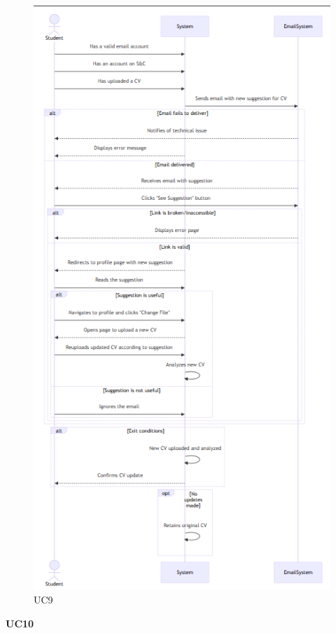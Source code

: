 \begin{figure}
    \centering
    \includegraphics[width=0.7\linewidth]{RASD//Images/UC8.png}
    \caption{UC9}
\end{figure}

\pagebreak
\textbf{UC10}

